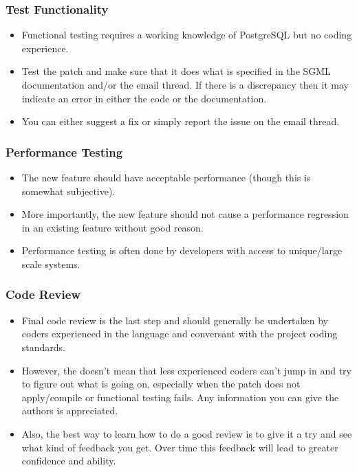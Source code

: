 \begin{frame}
    \frametitle{Test Functionality}

    \begin{itemize}
        \item Functional testing requires a working knowledge of PostgreSQL but no coding experience.\pause

        \item Test the patch and make sure that it does what is specified in the SGML documentation and/or the email thread.  If there is a discrepancy then it may indicate an error in either the code or the documentation.\pause

        \item You can either suggest a fix or simply report the issue on the email thread.
    \end{itemize}
\end{frame}

\begin{frame}
    \frametitle{Performance Testing}

    \begin{itemize}
        \item The new feature should have acceptable performance (though this is somewhat subjective).\pause

        \item More importantly, the new feature should not cause a performance regression in an existing feature without good reason.\pause

        \item Performance testing is often done by developers with access to unique/large scale systems.
    \end{itemize}
\end{frame}

\begin{frame}
    \frametitle{Code Review}

    \begin{itemize}
        \item Final code review is the last step and should generally be undertaken by coders experienced in the language and conversant with the project coding standards.\pause

        \item However, the doesn't mean that less experienced coders can't jump in and try to figure out what is going on, especially when the patch does not apply/compile or functional testing fails.  Any information you can give the authors is appreciated.\pause

        \item Also, the best way to learn how to do a good review is to give it a try and see what kind of feedback you get.  Over time this feedback will lead to greater confidence and ability.
    \end{itemize}
\end{frame}

